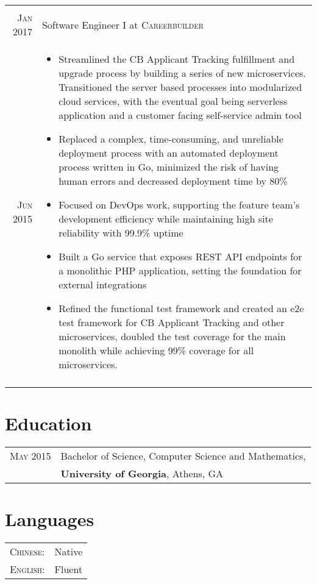 \documentclass[a4paper,10pt]{article}
\begin{document}
\begin{tabular}{r|p{13cm}}
 \\
 \multicolumn{2}{c}{} \\
 \textsc{Jan 2017} & Software Engineer I at \textsc{Careerbuilder} \\
 \textsc{Jun 2015} &
 \begin{itemize}
   \item \footnotesize{Streamlined the CB Applicant Tracking fulfillment and upgrade process by building a series of new microservices. Transitioned the server based processes into modularized cloud services, with the eventual goal being serverless application and a customer facing self-service admin tool }
   \item \footnotesize{Replaced a complex, time-consuming, and unreliable deployment process with an automated deployment process written in Go, minimized the risk of having human errors and decreased deployment time by 80\%}
   \item \footnotesize{Focused on DevOps work, supporting the feature team's development efficiency while maintaining high site reliability with 99.9\% uptime}
   \item \footnotesize{Built a Go service that exposes REST API endpoints for a monolithic PHP application, setting the foundation for external integrations}
   \item \footnotesize{Refined the functional test framework and created an e2e test framework for CB Applicant Tracking and other microservices, doubled the test coverage for the main monolith while achieving 99\% coverage for all microservices.}
 \end{itemize}
 \\
 \multicolumn{2}{c}{} \\
\end{tabular}

\section{Education}
\begin{tabular}{rl}	
 \textsc{May} 2015 & Bachelor of Science, Computer Science and Mathematics, \\ &
 \textbf{University of Georgia}, Athens, GA\\
\end{tabular}

\section{Languages}
\begin{tabular}{rl}
\textsc{Chinese:}&Native\\
\textsc{English:}&Fluent\\
\end{tabular}
\end{document}
